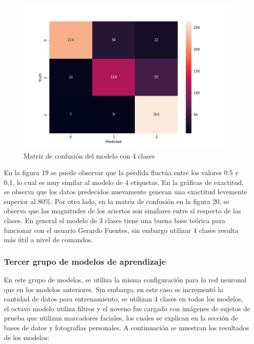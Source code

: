 \begin{figure}[H]
	\centering
	\includegraphics[scale=0.75]{figures/CM5.png}
	\caption{Matriz de confusión del modelo con 4 clases}
	\label{fig:img20}
\end{figure}

En la figura 19 se puede observar que la pérdida fluctúa entre los valores 0.5 y 0.1, lo cual es muy similar al modelo de 4 etiquetas. En la gráficas de exactitud, se observa que los datos predecidos nuevamente generan una exactitud levemente superior al 80\%. Por otro lado, en la matriz de confusión en la figura 20, se observa que las magnitudes de los aciertos son similares entre sí respecto de las clases. En general el modelo de 3 clases tiene una buena base teórica para funcionar con el usuario Gerardo Fuentes, sin embargo utilizar 4 clases resulta más útil a nivel de comandos. \par


\subsubsection{Tercer grupo de modelos de aprendizaje}

En este grupo de modelos, se utiliza la misma configuración para la red neuronal que en los modelos anteriores. Sin embargo, en este caso se incrementó la cantidad de datos para entrenamiento, se utilizan 4 clases en todos los modelos, el octavo modelo utiliza filtros y el noveno fue cargado con imágenes de sujetos de prueba que utilizan marcadores faciales, los cuales se explican en la sección de bases de datos y fotografías personales. A continuación se muestran los resultados de los modelos:

